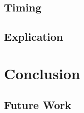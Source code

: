 \subsection{Timing}

\subsection{Explication}

\section{Conclusion}
\label{sec:conclusion}

\subsection{Future Work}
\label{subsec:future}